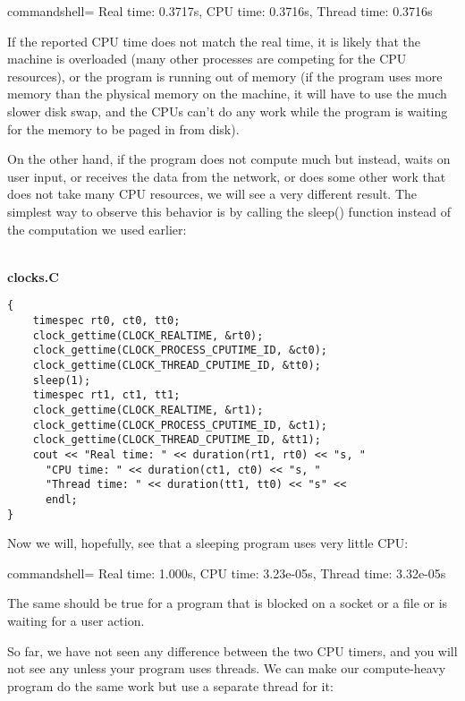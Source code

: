 \begin{tcblisting}{commandshell={}}
Real time: 0.3717s, CPU time: 0.3716s, Thread time: 0.3716s
\end{tcblisting}

If the reported CPU time does not match the real time, it is likely that the machine is overloaded (many other processes are competing for the CPU resources), or the program is running out of memory (if the program uses more memory than the physical memory on the machine, it will have to use the much slower disk swap, and the CPUs can't do any work while the program is waiting for the memory to be paged in from disk).

On the other hand, if the program does not compute much but instead, waits on user input, or receives the data from the network, or does some other work that does not take many CPU resources, we will see a very different result. The simplest way to observe this behavior is by calling the sleep() function instead of the computation we used earlier:

\hspace*{\fill} \\ %
\noindent
\textbf{clocks.C}
\begin{lstlisting}[style=styleCXX]
{
	timespec rt0, ct0, tt0;
	clock_gettime(CLOCK_REALTIME, &rt0);
	clock_gettime(CLOCK_PROCESS_CPUTIME_ID, &ct0);
	clock_gettime(CLOCK_THREAD_CPUTIME_ID, &tt0);
	sleep(1);
	timespec rt1, ct1, tt1;
	clock_gettime(CLOCK_REALTIME, &rt1);
	clock_gettime(CLOCK_PROCESS_CPUTIME_ID, &ct1);
	clock_gettime(CLOCK_THREAD_CPUTIME_ID, &tt1);
	cout << "Real time: " << duration(rt1, rt0) << "s, "
	  "CPU time: " << duration(ct1, ct0) << "s, "
	  "Thread time: " << duration(tt1, tt0) << "s" <<
  	  endl;
}
\end{lstlisting}

Now we will, hopefully, see that a sleeping program uses very little CPU:

\begin{tcblisting}{commandshell={}}
Real time: 1.000s, CPU time: 3.23e-05s, Thread time: 3.32e-05s
\end{tcblisting}

The same should be true for a program that is blocked on a socket or a file or is waiting for a user action.

So far, we have not seen any difference between the two CPU timers, and you will not see any unless your program uses threads. We can make our compute-heavy program do the same work but use a separate thread for it:


